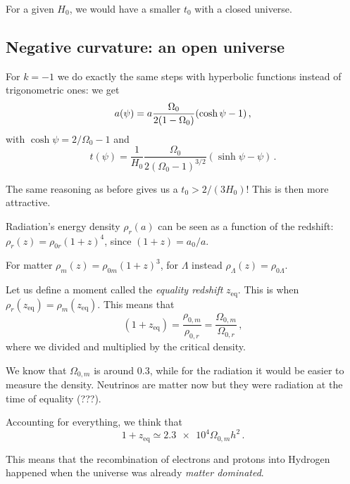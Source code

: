 \documentclass[main.tex]{subfiles}
\begin{document}
For a given \(H_0 \), we would have a smaller \(t_0 \) with a closed universe.

\subsection{Negative curvature: an open universe}

For \(k = -1\) we do exactly the same steps with hyperbolic functions instead of trigonometric ones: we get 
%
\begin{equation}
  a ( \psi ) = a \frac{\Omega_0 }{2 (1-\Omega_0)} \qty(\cosh \psi -1)
\,,
\end{equation}
%
with \(\cosh\psi = 2/\Omega_0 -1\) and 
%
\begin{equation}
  t (\psi ) =  \frac{1}{H_0 } \frac{\Omega_0}{2 (\Omega_0 -1)^{3/2}}(\sinh \psi - \psi  )
\,.
\end{equation}
%

The same reasoning as before gives us a \(t_0 > 2 / (3 H_0 )\)! This is then more attractive.

Radiation's energy density \(\rho _r (a)\) can be seen as a function of the redshift: \(\rho _r (z ) = \rho _{0r} (1+z)^{4}\), since \((1+z) = a_0 / a\).

For matter \(\rho _m (z) = \rho_{0m} (1+z)^{3}\), for \(\Lambda \) instead \(\rho _\Lambda (z) = \rho _{0 \Lambda }\).

Let us define a moment called the \emph{equality redshift} \(z _{\text{eq}}\). This is when \(\rho _r (z _{\text{eq}}) = \rho _m (z _{\text{eq}})\). This means that 
%
\begin{equation}
  (1+z _{\text{eq}}) = \frac{\rho _{0,m}}{\rho _{0,r}} 
  = \frac{\Omega_{0,m}}{\Omega_{0,r}}
\,,
\end{equation}
%
where we divided and multiplied by the critical density.

We know that \(\Omega_{0,m}\) is around \num{0.3}, while for the radiation it would be easier to measure the density.
Neutrinos are matter now but they were radiation at the time of equality (???).

Accounting for everything, we think that 
%
\begin{equation}
  1 + z _{\text{eq}} \simeq \num{2.3e4} \Omega_{0, m} h^2
\,.
\end{equation}

This means that the recombination of electrons and protons into Hydrogen happened when the universe was already \emph{matter dominated}.
\end{document}
